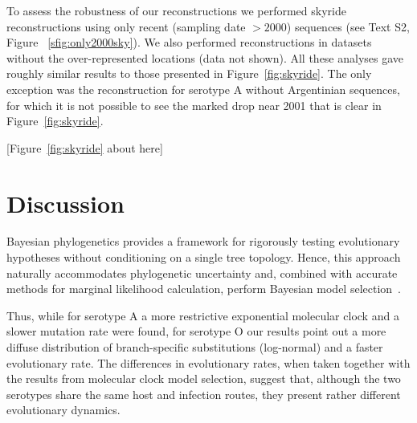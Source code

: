\documentclass[10pt]{article}
\begin{document}
To assess the robustness of our reconstructions we performed skyride reconstructions using only recent (sampling date $>2000$) sequences (see Text S2, Figure ~\ref{sfig:only2000sky}).
We also performed reconstructions in datasets without the over-represented locations (data not shown). All these analyses gave roughly similar results to those presented in Figure~\ref{fig:skyride}. The only exception was the reconstruction for serotype A without Argentinian sequences, for which it is not possible to see the marked drop near 2001 that is clear in Figure~\ref{fig:skyride}. 

\begin{center}
 [Figure~\ref{fig:skyride} about here]
\end{center}

\section*{Discussion}
Bayesian phylogenetics provides a framework for rigorously testing evolutionary hypotheses without conditioning on a single tree topology. Hence, this approach naturally accommodates phylogenetic uncertainty and, combined with accurate methods for marginal likelihood calculation, perform Bayesian model selection~\cite{Baele2012,Baele2013a,Baele2013b}.

Thus, while for serotype A a more restrictive exponential molecular clock and a slower mutation rate were found, for serotype O our results point out a more diffuse distribution of branch-specific substitutions (log-normal) and a faster evolutionary rate.
The differences in evolutionary rates, when taken together with the results from molecular clock model selection, suggest that, although the two serotypes share the same host and infection routes, they present rather different evolutionary dynamics. 

\end{document}
